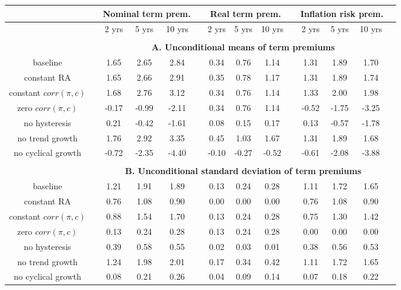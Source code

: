 \begin{tabular}{cccccccccccccc} \hline &&\multicolumn{3}{c}{Nominal term prem.}&&\multicolumn{3}{c}{Real term prem.}&&\multicolumn{3}{c}{Inflation risk prem.}\\ \hline &&2 yrs& 5 yrs& 10 yrs&&2 yrs& 5 yrs& 10 yrs&&2 yrs& 5 yrs& 10 yrs\\ \hline \\ && \multicolumn{11}{c}{\bf{A. Unconditional means of term premiums}}\\ \hline baseline & & 1.65 & 2.65 & 2.84 &  & 0.34 & 0.76 & 1.14 &  & 1.31 & 1.89 & 1.70 \\ constant RA & & 1.65 & 2.66 & 2.91 &  & 0.35 & 0.78 & 1.17 &  & 1.31 & 1.89 & 1.74 \\ constant $corr(\pi,c)$ & & 1.68 & 2.76 & 3.12 &  & 0.34 & 0.76 & 1.14 &  & 1.33 & 2.00 & 1.98 \\ zero $corr(\pi,c)$ & & -0.17 & -0.99 & -2.11 &  & 0.34 & 0.76 & 1.14 &  & -0.52 & -1.75 & -3.25 \\ no hysteresis & & 0.21 & -0.42 & -1.61 &  & 0.08 & 0.15 & 0.17 &  & 0.13 & -0.57 & -1.78 \\ no trend growth & & 1.76 & 2.92 & 3.35 &  & 0.45 & 1.03 & 1.67 &  & 1.31 & 1.89 & 1.68 \\ no cyclical growth & & -0.72 & -2.35 & -4.40 &  & -0.10 & -0.27 & -0.52 &  & -0.61 & -2.08 & -3.88 \\  \hline \\ && \multicolumn{11}{c}{\bf{B. Unconditional standard deviation of term premiums}}\\ \hline baseline & & 1.21 & 1.91 & 1.89 &  & 0.13 & 0.24 & 0.28 &  & 1.11 & 1.72 & 1.65 \\ constant RA & & 0.76 & 1.08 & 0.90 &  & 0.00 & 0.00 & 0.00 &  & 0.76 & 1.08 & 0.90 \\ constant $corr(\pi,c)$ & & 0.88 & 1.54 & 1.70 &  & 0.13 & 0.24 & 0.28 &  & 0.75 & 1.30 & 1.42 \\ zero $corr(\pi,c)$ & & 0.13 & 0.24 & 0.28 &  & 0.13 & 0.24 & 0.28 &  & 0.00 & 0.00 & 0.00 \\ no hysteresis& & 0.39 & 0.58 & 0.55 &  & 0.02 & 0.03 & 0.01 &  & 0.38 & 0.56 & 0.53 \\ no trend growth & & 1.24 & 1.98 & 2.01 &  & 0.17 & 0.34 & 0.42 &  & 1.11 & 1.72 & 1.65 \\ no cyclical growth & & 0.08 & 0.21 & 0.26 &  & 0.04 & 0.09 & 0.14 &  & 0.07 & 0.18 & 0.22 \\ \hline \end{tabular}